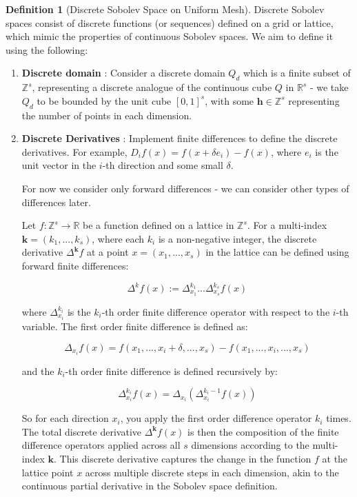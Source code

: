 \documentclass[11pt,a4paper]{article}
\theoremstyle{plain}
\theoremstyle{definition}
\newtheorem{definition}[theorem]{Definition}
\theoremstyle{remark}
\begin{document}
\begin{definition}[Discrete Sobolev Space on Uniform Mesh]
    

Discrete Sobolev spaces consist of discrete functions (or sequences) defined on a grid or lattice, which mimic the properties of continuous Sobolev spaces. We aim to define it using the following:

\begin{enumerate}
    \item \textbf{Discrete domain} : Consider a discrete domain \( Q_d \) which is a finite subset of \( \mathbb{Z}^s \), representing a discrete analogue of the continuous cube \( Q \) in \( \mathbb{R}^s \) - we take \(Q_{d}\) to be bounded by the unit cube \( [0,1]^s \), with some \( \mathbf{h} \in \mathbb{Z}^{s}  \) representing the number of points in each dimension.
    \item \textbf{Discrete Derivatives} : Implement finite differences to define the discrete derivatives. For example, \( D_i f(x) = f(x + \delta e_i) - f(x) \), where \( e_i \) is the unit vector in the \( i \)-th direction and some small \(\delta\).
    
    For now we consider only forward differences - we can consider other types of differences later.

    Let \( f: \mathbb{Z}^s \rightarrow \mathbb{R} \) be a function defined on a lattice in \( \mathbb{Z}^s \). For a multi-index \( \mathbf{k} = (k_1, ..., k_s) \), where each \( k_i \) is a non-negative integer, the discrete derivative \( \Delta^{\mathbf{k}} f \) at a point \( x = (x_1, ..., x_s) \) in the lattice can be defined using forward finite differences:

    \[ \Delta^k f(x) := \Delta^{k_1}_{x_1} ... \Delta^{k_s}_{x_s} f(x) \]

    where \( \Delta^{k_i}_{x_i} \) is the \( k_i \)-th order finite difference operator with respect to the \( i \)-th variable. The first order finite difference is defined as:

    \[ \Delta_{x_i} f(x) = f(x_1, ..., x_i + \delta, ..., x_s) - f(x_1, ..., x_i, ..., x_s) \]

    and the \( k_i \)-th order finite difference is defined recursively by:

    \[ \Delta^{k_i}_{x_i} f(x) = \Delta_{x_i} (\Delta^{k_i-1}_{x_i} f(x)) \]

    So for each direction \( x_i \), you apply the first order difference operator \( k_i \) times. The total discrete derivative \( \Delta^{\mathbf{k}}  f(x) \) is then the composition of the finite difference operators applied across all \( s \) dimensions according to the multi-index \( \mathbf{k} \). This discrete derivative captures the change in the function \( f \) at the lattice point \( x \) across multiple discrete steps in each dimension, akin to the continuous partial derivative in the Sobolev space definition.


\end{enumerate}
\end{definition}
\end{document}
